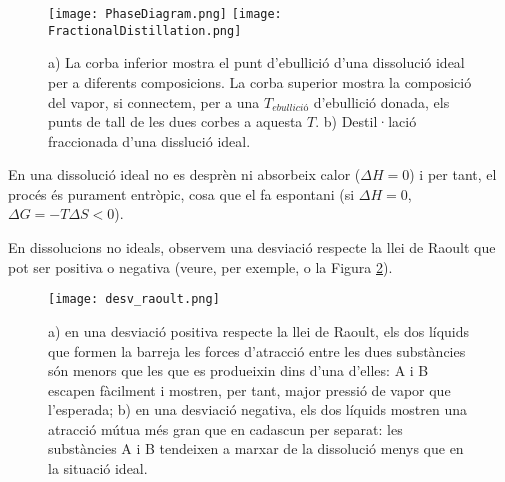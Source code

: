 \begin{figure}[h]
\centering
\texttt{[image: PhaseDiagram.png]}
\texttt{[image: FractionalDistillation.png]}
\caption[Diagrama de fases i destil·lació fraccionada d'una dissolució ideal]{a) La corba inferior mostra el punt d'ebullició d'una dissolució ideal per a diferents composicions. La corba superior mostra la composició del vapor, si connectem, per a una $T_{ebullició}$ d'ebullició donada, els punts de tall de les dues corbes a aquesta $T$. b) Destil·lació fraccionada d'una disslució ideal.}
\label{fig:PhaseDiagram}
\end{figure}

En una dissolució ideal no es desprèn ni absorbeix calor ($\Delta H=0$) i per tant, el procés és purament entròpic, cosa que el fa espontani (si $\Delta H=0$, $\Delta G= -T \Delta S<0$).

En dissolucions no ideals, observem una desviació respecte la llei de Raoult que pot ser positiva o negativa (veure, per exemple,  o la Figura \ref{fig:desv_raoult}).
\begin{figure}[h]
\centering
\texttt{[image: desv\_raoult.png]}
\caption[Llei de Raoult per dissolucions ideals i no ideals]{a) en una desviació positiva respecte la llei de Raoult, els dos líquids que formen la barreja les forces d'atracció entre les dues substàncies són menors que les que es produeixin dins d'una d'elles: A i B escapen fàcilment i mostren, per tant, major pressió de vapor que l'esperada; b) en una desviació negativa, els dos líquids mostren una atracció mútua més gran que en cadascun per separat: les substàncies A i B tendeixen a marxar de la dissolució menys que en la situació ideal.}
\label{fig:desv_raoult}
\end{figure}

